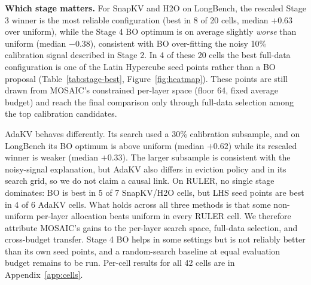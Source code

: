 \documentclass[11pt]{article}
\begin{document}
\textbf{Which stage matters.} For SnapKV and H2O on LongBench, the rescaled Stage 3 winner is the most reliable configuration (best in 8 of 20 cells, median $+0.63$ over uniform), while the Stage 4 BO optimum is on average slightly \emph{worse} than uniform (median $-0.38$), consistent with BO over-fitting the noisy 10\% calibration signal described in Stage 2. In 4 of these 20 cells the best full-data configuration is one of the Latin Hypercube seed points rather than a BO proposal (Table~\ref{tab:stage-best}, Figure~\ref{fig:heatmap}). These points are still drawn from MOSAIC's constrained per-layer space (floor 64, fixed average budget) and reach the final comparison only through full-data selection among the top calibration candidates.

AdaKV behaves differently. Its search used a 30\% calibration subsample, and on LongBench its BO optimum is above uniform (median $+0.62$) while its rescaled winner is weaker (median $+0.33$). The larger subsample is consistent with the noisy-signal explanation, but AdaKV also differs in eviction policy and in its search grid, so we do not claim a causal link. On RULER, no single stage dominates: BO is best in 5 of 7 SnapKV/H2O cells, but LHS seed points are best in 4 of 6 AdaKV cells. What holds across all three methods is that some non-uniform per-layer allocation beats uniform in every RULER cell. We therefore attribute MOSAIC's gains to the per-layer search space, full-data selection, and cross-budget transfer. Stage 4 BO helps in some settings but is not reliably better than its own seed points, and a random-search baseline at equal evaluation budget remains to be run. Per-cell results for all 42 cells are in Appendix~\ref{app:cells}.
\end{document}
